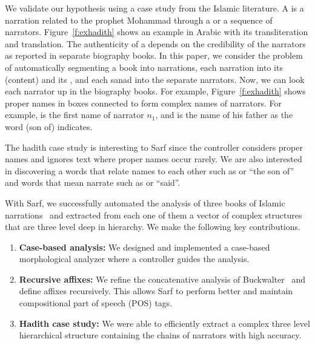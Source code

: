 \documentclass[11pt]{article}
\newcommand{\noArRL}[1]{\arabfalse\RL{#1}\arabtrue}
\newcommand{\noTrRL}[1]{\transfalse\RL{#1}\transtrue}
\begin{document}
We validate our hypothesis using a case study from the Islamic 
literature. 
A  is a narration related to the prophet Mohammad
through a  or a sequence of narrators. 
Figure~\ref{f:exhadith} shows an example \noArRL{.hady_t} in 
Arabic with its transliteration and translation. 
The authenticity of a \noArRL{.hady_t} depends on 
the credibility of the narrators as reported in 
separate biography books. 
In this paper, we consider the problem of automatically segmenting
a \noArRL{.hady_t} book into narrations, each 
narration into its  (content) and its \noArRL{sanad},
and each sanad into the 
separate narrators. Now, we can look each narrator 
up in the biography books. 
For example, 
Figure~\ref{f:exhadith} shows proper names in boxes connected
to form complex names of narrators. 
For example, 
\noTrRL{qtybT} is the first name 
of narrator $n_1$, and 
\noTrRL{s`yd} is the name of his father as 
the word \noTrRL{bn} (son of) indicates. 


The hadith case study is interesting to Sarf since the controller
considers %
proper names and ignores text where
proper names occur rarely.%
We are also interested in discovering a words 
that relate names to each other such as  or ``the son of''
and words that mean narrate such as  or ``said''. 

With Sarf, we successfully automated the analysis of 
three books of Islamic narrations~\cite{IbnHanbal,AlTousi,AlKulayni}
and extracted from each one of them a vector of complex structures 
that are three level deep in hierarchy.
We make the following key contributions. 
\begin{enumerate}
\item {\bf Case-based analysis:}  We designed and implemented
a case-based morphological analyzer where a controller
guides the analysis. 
\item {\bf Recursive affixes:}
We refine the concatenative analysis of 
Buckwalter~ and define affixes
recursively. 
This allows Sarf to perform better and 
maintain compositional part of speech (POS) tags.
\item {\bf Hadith case study:}
We were able to efficiently extract a complex three 
level hierarchical 
structure containing the chains of narrators 
with high accuracy. 
\end{enumerate}
\end{document}
